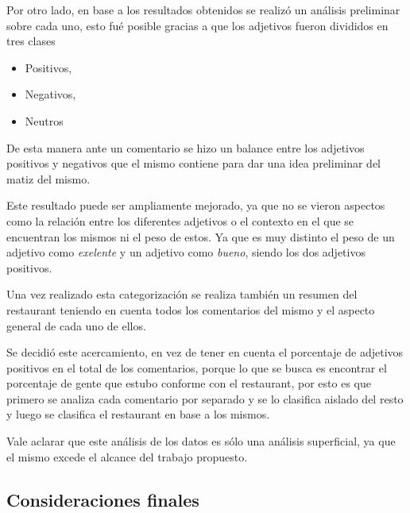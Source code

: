 Por otro lado, en base a los resultados obtenidos se realizó un análisis preliminar sobre cada uno, esto fué posible gracias a que los adjetivos fueron divididos en tres clases
\begin{itemize}
\item Positivos,
\item Negativos,
\item Neutros
\end{itemize}
De esta manera ante un comentario se hizo un balance entre los adjetivos positivos y negativos que el mismo contiene para dar una idea preliminar del matiz del mismo.

Este resultado puede ser ampliamente mejorado, ya que no se vieron aspectos como la relación entre los diferentes adjetivos o el contexto en el que se encuentran los mismos ni el peso de estos. Ya que es muy distinto el peso de un adjetivo como \emph{exelente} y un adjetivo como \emph{bueno}, siendo los dos adjetivos positivos.

Una vez realizado esta categorización se realiza también un resumen del restaurant teniendo en cuenta todos los comentarios del mismo y el aspecto general de cada uno de ellos.

Se decidió este acercamiento, en vez de tener en cuenta el porcentaje de adjetivos positivos en el total de los comentarios, porque lo que se busca es encontrar el porcentaje de gente que estubo conforme con el restaurant, por esto es que primero se analiza cada comentario por separado y se lo clasifica aislado del resto y luego se clasifica el restaurant en base a los mismos.

Vale aclarar que este análisis de los datos es sólo una análisis superficial, ya que el mismo excede el alcance del trabajo propuesto.

\subsection{Consideraciones finales}
